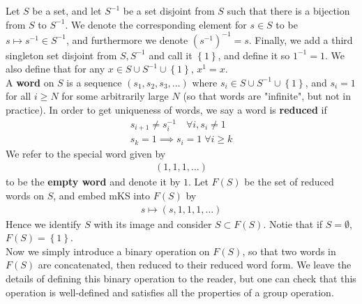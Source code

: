 \documentclass{memoir}
\begin{document}
\begin{general}
	Let \(S\) be a set, and let \(S^{-1}\) be a set disjoint from \(S\) such that there is a bijection from \(S\) to \(S^{-1}\). We denote the corresponding element for \(s \in S\) to be \(s\mapsto s^{-1}\in S^{-1}\), and furthermore we denote \((s^{-1})^{-1} = s\). Finally, we add a third singleton set disjoint from \(S,S^{-1}\) and call it \(\left\{ 1 \right\} \), and define it so \(1^{-1} = 1\). We also define that for any \(x \in S \cup S^{-1}\cup \left\{ 1 \right\} \), \(x^{1} = x\).\\

	A \textbf{word} on \(S\) is a sequence \((s_1,s_2,s_3,\ldots)\) where \(s_i \in S\cup S^{-1} \cup \left\{ 1 \right\} \), and \(s_i = 1\) for all \(i\geq N\) for some arbitrarily large \(N\) (so that words are "infinite", but not in practice). In order to get uniqueness of words, we say a word is \textbf{reduced} if
	\begin{align*}
		s_{i+1} \neq s_{i}^{-1} \quad \forall i, s_i \neq 1\\
		s_k = 1 \implies s_i = 1 \; \forall i \geq k
	\end{align*}
	We refer to the special word given by
	\begin{align*}
		(1,1,1,\ldots)
	\end{align*}
	to be the \textbf{empty word} and denote it by \(1\). Let \(F(S)\) be the set of reduced words on \(S\), and embed mKS into \(F(S)\) by
	\begin{align*}
		s \mapsto (s,1,1,1,\ldots)
	\end{align*}
	Hence we identify \(S\) with its image and consider \(S\subset F(S)\). Notie that if \(S = \emptyset\), \(F(S) = \left\{ 1 \right\} \).\\

	Now we simply introduce a binary operation on \(F(S)\), so that two words in \(F(S)\) are concatenated, then reduced to their reduced word form. We leave the details of defining this binary operation to the reader, but one can check that this operation is well-defined and satisfies all the properties of a group operation.
\end{general}
\end{document}

